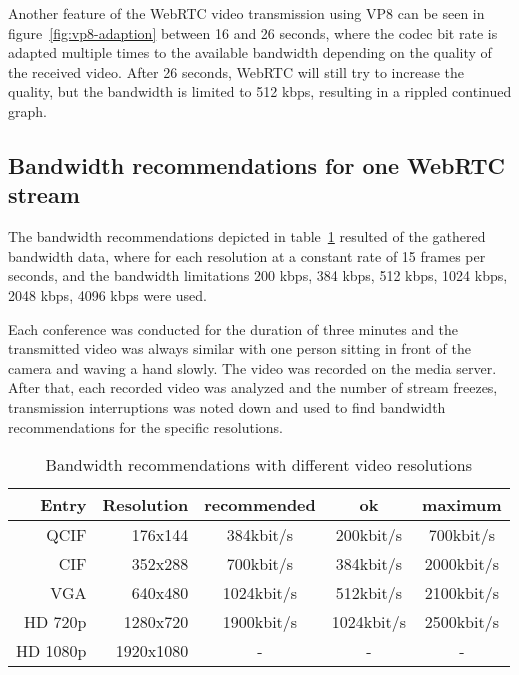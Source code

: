 \documentclass[../../../thesis.tex]{subfiles}
\begin{document}
Another feature of the WebRTC video transmission using VP8 can be seen in figure~\ref{fig:vp8-adaption} between 16 and 26 seconds, where the codec bit rate is adapted multiple times to the available bandwidth depending on the quality of the received video. After 26 seconds, WebRTC will still try to increase the quality, but the bandwidth is limited to 512 kbps, resulting in a rippled continued graph.
\clearpage




\subsection{Bandwidth recommendations for one WebRTC stream}
The bandwidth recommendations depicted in table~\ref{tab:recommendations} resulted of the gathered bandwidth data, where for each resolution at a constant rate of 15 frames per seconds, and the bandwidth limitations 200 kbps, 384 kbps, 512 kbps, 1024 kbps, 2048 kbps, 4096 kbps were used.\par
Each conference was conducted for the duration of three minutes and the transmitted video was always similar with one person sitting in front of the camera and waving a hand slowly. The video was recorded on the media server.\\

After that, each recorded video was analyzed and the number of stream freezes, transmission interruptions was noted down and used to find bandwidth recommendations for the specific resolutions.


\begin{table}[htbp]
  \centering
  \caption{Bandwidth recommendations with different video resolutions}
    \begin{tabular}{r r c c c}
    \toprule
    \textbf{Entry} & \textbf{Resolution} & \textbf{recommended} & \textbf{ok\footnotemark} & \textbf{maximum\footnotemark} \\
    \midrule
    QCIF  & 176x144 & 384kbit/s & 200kbit/s & 700kbit/s \\
    CIF   & 352x288 & 700kbit/s & 384kbit/s & 2000kbit/s \\
    VGA   & 640x480 & 1024kbit/s & 512kbit/s & 2100kbit/s \\
    HD 720p & 1280x720 & 1900kbit/s & 1024kbit/s & 2500kbit/s \\
    HD 1080p & 1920x1080 & -     & -     & - \\
    \bottomrule
    \end{tabular}%
  \label{tab:recommendations}%
\end{table}%
\end{document}
